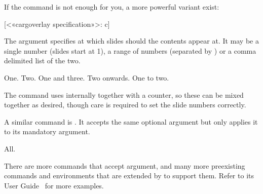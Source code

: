 If the  command is not enough for you, a more powerful variant
exist:
\begin{lscommand}
  [<«\bs carg{overlay specification}»>: c]
\end{lscommand}
The  argument specifies at which slides should the
contents appear at. It may be a single number (slides start at 1), a range of
numbers (separated by \cargv{-}) or a comma delimited list of the two.
\begin{chktexignore}
\begin{example}[
  vertical_mode,
  to_page=3,
  paperheight=2.8cm,
  paperwidth=3.7cm,
  examplewidth=.95\linewidth,
]
\begin{frame}
   One.  Two.  One and
  three.  Two onwards.  One to two.
\end{frame}
\end{example}
\end{chktexignore}
The  command uses  internally together with a counter,
so these can be mixed together as desired, though care is required to set the
slide numbers correctly.

A similar command is . It accepts the same optional  argument but only applies it to its mandatory argument.
\begin{chktexignore}
\begin{example}[
  vertical_mode,
  to_page=3,
  paperheight=2.8cm,
  paperwidth=3.7cm,
  examplewidth=.95\linewidth,
]
\begin{frame}
     All.
\end{frame}
\end{example}
\end{chktexignore}
There are more commands that accept  argument, and
many more preexisting commands and environments that are extended by
 to support them. Refer to its User Guide~\cite{pack:beamer} for
more examples.

